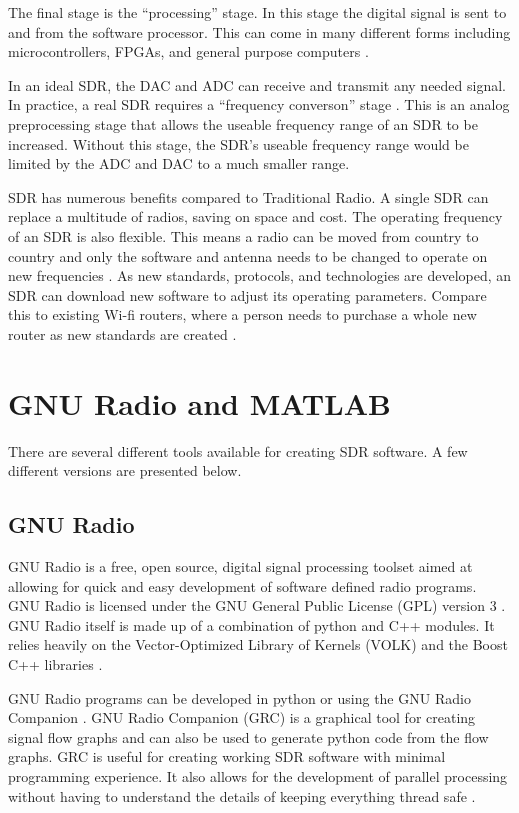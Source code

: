 The final stage is the ``processing'' stage. In this stage the digital signal is sent to and from the software processor. This can come in many different forms including microcontrollers, FPGAs, and general purpose computers \cite{0020}.  

In an ideal SDR, the DAC and ADC can receive and transmit any needed signal. In practice, a real SDR requires a ``frequency converson'' stage \cite{0020}. This is an analog preprocessing stage that allows the useable frequency range of an SDR to be increased. Without this stage, the SDR's useable frequency range would be limited by the ADC and DAC to a much smaller range. 

SDR has numerous benefits compared to Traditional Radio. A single SDR can replace a multitude of radios, saving on space and cost. The operating frequency of an SDR is also flexible. This means a radio can be moved from country to country and only the software and antenna needs to be changed to operate on new frequencies \cite{0019}. As new standards, protocols, and technologies are developed, an SDR can download new software to adjust its operating parameters. Compare this to existing Wi-fi routers, where a person needs to purchase a whole new router as new standards are created \cite{0019}. 


\section{GNU Radio and MATLAB}

There are several different tools available for creating SDR software. A few different versions are presented below. 

\subsection{GNU Radio}

GNU Radio is a free, open source, digital signal processing toolset aimed at allowing for quick and easy development of software defined radio programs. GNU Radio is licensed under the GNU General Public License (GPL) version 3 \cite{0019}. GNU Radio itself is made up of a combination of python and C++ modules. It relies heavily on the Vector-Optimized Library of Kernels (VOLK) \cite{0021} and the Boost C++ libraries \cite{0022}. 

GNU Radio programs can be developed in python or using the GNU Radio Companion \cite{0023}. GNU Radio Companion (GRC) is a graphical tool for creating signal flow graphs and can also be used to generate python code from the flow graphs. GRC is useful for creating working SDR software with minimal programming experience. It also allows for the development of parallel processing without having to understand the details of keeping everything thread safe \cite{0023}.


